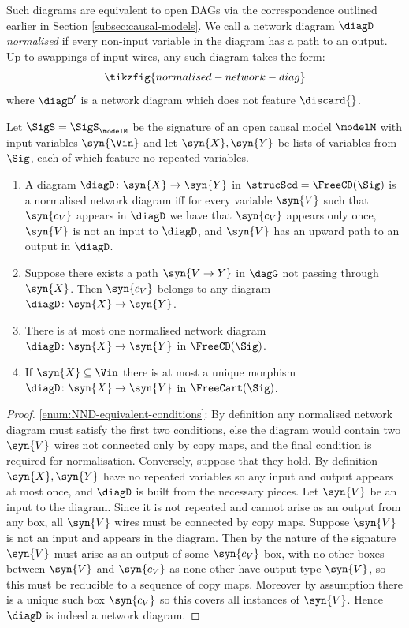 \documentclass{article}
\begin{document}
{Such diagrams are equivalent to open DAGs via the correspondence outlined earlier in Section \ref{subsec:causal-models}. We call a network diagram $\diagD$ \emph{normalised} if every non-input variable in the diagram has a path to an output. Up to swappings of input wires, any such diagram takes the form: 
\[
\tikzfig{normalised-network-diag}
\]
where $\diagD'$ is a network diagram which does not feature $\discard{}$. 

\color{black}

\begin{lemma} \label{lem:unique-ND}
Let $\SigS=\SigS_\modelM$ be the signature of an open causal model $\modelM$ with input variables $\syn{\Vin}$ and let $\syn{X}, \syn{Y}$ be lists of variables from $\Sig$, each of which feature no repeated variables.
\begin{enumerate}
\item \label{enum:NND-equivalent-conditions}
A diagram $\diagD \colon \syn{X} \to \syn{Y}$ in $\strucScd = \FreeCD(\Sig)$ is a normalised network diagram iff for every variable $\syn{V}$ such that $\syn{c_V}$ appears in $\diagD$ we have that $\syn{c_V}$ appears only once, $\syn{V}$ is not an input to $\diagD$, and $\syn{V}$ has an upward path to an output in $\diagD$.
\item \label{enum:path-to-diag}
Suppose there exists a path $\syn{V \to Y}$ in $\dagG$ not passing through $\syn{X}$. Then $\syn{c_V}$ belongs to any diagram $\diagD \colon \syn{X} \to \syn{Y}$.
\item \label{enum:LemFreeCD}
There is at most one normalised network diagram $\diagD \colon \syn{X} \to \syn{Y}$ in $\FreeCD(\Sig)$. 
\item \label{enum:LemFreeCart}
If $\syn{X} \subseteq \Vin$ there is at most a unique morphism $\diagD \colon \syn{X} \to \syn{Y}$ in $\FreeCart(\Sig)$.
\end{enumerate}
\end{lemma}

\begin{proof}
\eqref{enum:NND-equivalent-conditions}: By definition any normalised network diagram must satisfy the first two conditions, else the diagram would contain two $\syn{V}$ wires not connected only by copy maps, and the final condition is required for normalisation. Conversely, suppose that they hold. By definition $\syn{X}, \syn{Y}$ have no repeated variables so any input and output appears at most once, and $\diagD$ is built from the necessary pieces. Let $\syn{V}$ be an input to the diagram. Since it is not repeated and cannot arise as an output from any box, all $\syn{V}$ wires must be connected by copy maps. Suppose $\syn{V}$ is not an input and appears in the diagram. Then by the nature of the signature $\syn{V}$ must arise as an output of some $\syn{c_V}$ box, with no other boxes between $\syn{V}$ and $\syn{c_V}$ as none other have output type $\syn{V}$, so this must be reducible to a sequence of copy maps. Moreover by assumption there is a unique such box $\syn{c_V}$ so this covers all instances of $\syn{V}$. Hence $\diagD$ is indeed a network diagram. 


\end{proof}}
\end{document}
